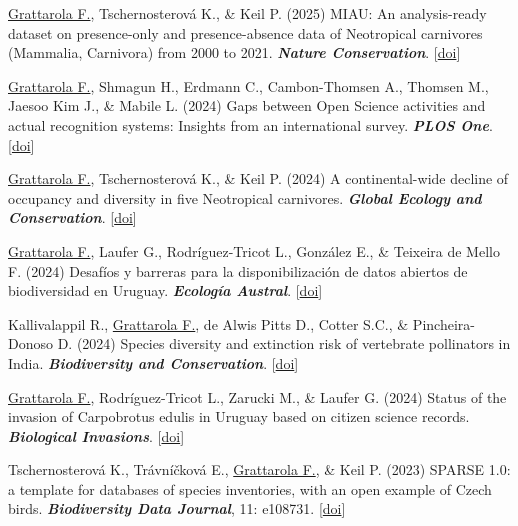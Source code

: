 \documentclass[9pt]{developercv} %
\begin{document}
\begin{etaremune}
\item \underline{Grattarola F.}, Tschernosterová K., \& Keil P. (2025) MIAU: An analysis-ready dataset on presence-only and presence-absence data of Neotropical carnivores (Mammalia, Carnivora) from 2000 to 2021. \textit{\textbf{Nature Conservation}}. [\href{https://doi.org/10.3897/natureconservation.58.140644}{doi}]

\item \underline{Grattarola F.}, Shmagun H., Erdmann C., Cambon-Thomsen A., Thomsen M., Jaesoo Kim J., \& Mabile L. (2024) Gaps between Open Science activities and actual recognition systems: Insights from an international survey. \textit{\textbf{PLOS One}}. [\href{https://doi.org/10.1371/journal.pone.0315632}{doi}]

\item \underline{Grattarola F.}, Tschernosterová K., \& Keil P. (2024) A continental-wide decline of occupancy and diversity in five Neotropical carnivores. \textit{\textbf{Global Ecology and Conservation}}. [\href{https://doi.org/10.1016/j.gecco.2024.e03226}{doi}]

\item \underline{Grattarola F.}, Laufer G., Rodríguez-Tricot L., González E., \& Teixeira de Mello F. (2024) Desafíos y barreras para la disponibilización de datos abiertos de biodiversidad en Uruguay. \textit{\textbf{Ecología Austral}}. [\href{https://doi.org/10.25260/EA.24.34.3.0.2413}{doi}]

\item Kallivalappil R., \underline{Grattarola F.}, de Alwis Pitts D., Cotter S.C., \& Pincheira-Donoso D. (2024) Species diversity and extinction risk of vertebrate pollinators in India. \textit{\textbf{Biodiversity and Conservation}}. [\href{https://doi.org/10.1007/s10531-024-02848-3}{doi}]

\item \underline{Grattarola F.}, Rodríguez-Tricot L., Zarucki M., \& Laufer G. (2024) Status of the invasion of Carpobrotus edulis in Uruguay based on citizen science records. \textit{\textbf{Biological Invasions}}. [\href{https://doi.org/10.1007/s10530-023-03242-w}{doi}]

\item Tschernosterová K., Trávníčková E., \underline{Grattarola F.}, \& Keil P. (2023) SPARSE 1.0: a template for databases of species inventories, with an open example of Czech birds. \textit{\textbf{Biodiversity Data Journal}}, 11: e108731. [\href{https://doi.org/10.3897/BDJ.11.e108731}{doi}]


\end{etaremune}
\end{document}
